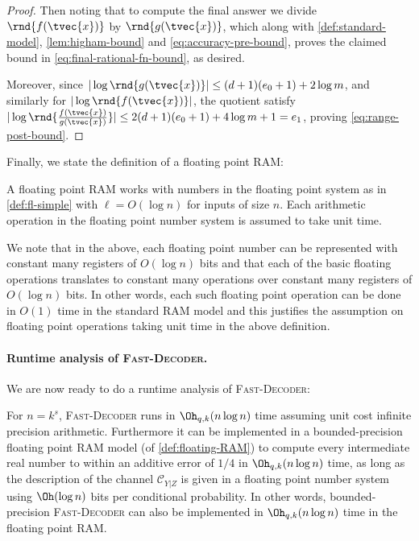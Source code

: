 \documentclass[11pt]{article}
\begin{document}
\begin{proof}
    Then noting that to compute the final answer we divide $\rnd{f(\tvec{x})}$ by $\rnd{g(\tvec{x})}$, which along with \cref{def:standard-model}, \cref{lem:higham-bound} and \cref{eq:accuracy-pre-bound}, proves the claimed bound in \cref{eq:final-rational-fn-bound}, as desired.
    
    Moreover, since $|\log \rnd{g(\tvec{x})}| \leq (d+1)(e_0 + 1) + 2 \log m$, and similarly for $|\log \rnd{f(\tvec{x})}|$, the quotient satisfy $|\log \rnd{ \frac{f(\tvec{x})}{g(\tvec{x})}}| \leq 2 (d+1)(e_0 + 1) + 4 \log m + 1 = e_1$, proving \cref{eq:range-post-bound}.
\end{proof}

Finally, we state the definition of a floating point RAM:
\begin{definition}
\label{def:floating-RAM}
A floating point RAM works with numbers in the floating point system as in \cref{def:fl-simple} with $\ell=O(\log{n})$ for inputs of size $n$. Each arithmetic operation in the floating point number  system is assumed to take unit time.
\end{definition}
We note that in the above, each floating point number can be represented with constant many registers of  $O(\log{n})$ bits and that each of the basic floating operations translates to constant many operations over constant many registers of $O(\log{n})$ bits. In other words, each such floating point operation can be done in $O(1)$ time in the standard RAM model and this justifies the assumption on floating point operations taking unit time in the above definition.

\paragraph{Runtime analysis of \textsc{Fast-Decoder}.}

We are now ready to do a runtime analysis of \textsc{Fast-Decoder}:

	\begin{lemma}\label{lem:nlogn}
		For $n = k^s$, \textsc{Fast-Decoder} runs in $\Oh_{q,k}(n\log n)$ time assuming unit cost infinite precision arithmetic. Furthermore it can be implemented in a bounded-precision floating point RAM
		model (of \cref{def:floating-RAM}) to compute every intermediate real number to within an additive error of $1/4$ in $\Oh_{q,k}(n\log n)$ time, as long as the description of the channel $\mathcal{C}_{Y|Z}$ is given in a floating point number system using $\Oh(\log n)$ bits per conditional probability. In other words, bounded-precision \textsc{Fast-Decoder} can also be implemented in $\Oh_{q,k}(n\log n)$ time in the floating point RAM.
	\end{lemma}
	
\end{document}
